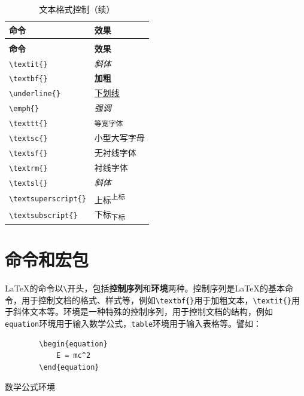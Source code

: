 \begin{longtable}{p{3cm}<{\centering}|p{11cm}<{\centering}}
    \caption{文本格式控制} \label{tab:git-local-operations} \\
    \toprule
        \textbf{命令} & \textbf{效果} \\
    \midrule
    \endfirsthead
    \caption[]{文本格式控制（续）} \\
    \toprule
        \textbf{命令} & \textbf{效果} \\
    \midrule
    \endhead
    \midrule
    \endfoot
    \bottomrule
    \endlastfoot
        \verb|\textit{}| & \textit{斜体} \\
        \verb|\textbf{}| & \textbf{加粗} \\
        \verb|\underline{}| & \underline{下划线} \\
        \verb|\emph{}| & \emph{强调} \\
        \verb|\texttt{}| & \texttt{等宽字体} \\
        \verb|\textsc{}| & \textsc{小型大写字母} \\
        \verb|\textsf{}| & \textsf{无衬线字体} \\
        \verb|\textrm{}| & \textrm{衬线字体} \\
        \verb|\textsl{}| & \textsl{斜体} \\
        \verb|\textsuperscript{}| & 上标\textsuperscript{上标} \\
        \verb|\textsubscript{}| & 下标\textsubscript{下标} \\
\end{longtable}



\section{命令和宏包}

\LaTeX{}的命令以\verb|\|开头，包括\textbf{控制序列}和\textbf{环境}两种。控制序列是\LaTeX{}的基本命令，用于控制文档的格式、样式等，例如\verb|\textbf{}|用于加粗文本，\verb|\textit{}|用于斜体文本等。环境是一种特殊的控制序列，用于控制文档的结构，例如\verb|equation|环境用于输入数学公式，\verb|table|环境用于输入表格等。譬如：

\begin{longlisting}
    \begin{verbatim}
        \begin{equation}
            E = mc^2
        \end{equation}
    \end{verbatim}
    \caption{数学公式环境}
    \label{listing:equation-latex-env}
\end{longlisting}


